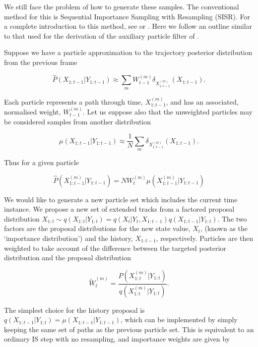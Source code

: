 We still face the problem of how to generate these samples. The conventional method for this is Sequential Importance Sampling with Resampling (SISR). For a complete introduction to this method, see \cite{Cappe2007} or \cite{Doucet2009}. Here we follow an outline similar to that used for the derivation of the auxiliary particle filter of \cite{Pitt1999}.

Suppose we have a particle approximation to the trajectory posterior distribution from the previous frame

\begin{equation}
\hat{P}(X_{1:t-1}|Y_{1:t-1}) \approx \sum_m{ W_{t-1}^{(m)} \delta_{X_{1:t-1}^{(m)}} (X_{1:t-1}) }.
\end{equation}

Each particle represents a path through time, $X_{1:t-1}^{(m)}$, and has an associated, normalised weight, $W_{t-1}^{(m)}$. Let us suppose also that the unweighted particles may be considered samples from another distribution

\begin{equation}
\mu(X_{1:t-1}|Y_{1:t-1}) \approx \frac{1}{N} \sum_m{ \delta_{X_{1:t-1}^{(m)}} (X_{1:t-1}) }.
\label{eq:UnweightParticleDistn}
\end{equation}

Thus for a given particle

\begin{equation}
\hat{P}(X_{1:t-1}^{(m)}|Y_{1:t-1}) = N W_t^{(m)} \mu(X_{1:t-1}^{(m)}|Y_{1:t-1})
\label{eq:}
\end{equation}

We would like to generate a new particle set which includes the current time instance. We propose a new set of extended tracks from a factored proposal distribution $X_{1:t} \sim q(X_{1:t}|Y_{1:t}) = q(X_{t}|Y_{t}, X_{1:t-1}) q(X_{1:t-1}|Y_{1:t})$. The two factors are the proposal distributions for the new state value, $X_t$, (known as the `importance distribution') and the history, $X_{1:t-1}$, respectively. Particles are then weighted to take account of the difference between the targeted posterior distribution and the proposal distribution

\begin{equation}
\tilde{W}_t^{(m)} = \frac{P(X_{1:t}^{(m)}|Y_{1:t})}{q(X_{1:t}^{(m)}|Y_{1:t})}.
\label{eq:ImportanceWeights}
\end{equation}

The simplest choice for the history proposal is $q(X_{1:t-1}|Y_{1:t}) = \mu(X_{1:t-1}|Y_{1:t-1})$, which can be implemented by simply keeping the same set of paths as the previous particle set. This is equivalent to an ordinary IS step with no resampling, and importance weights are given by

